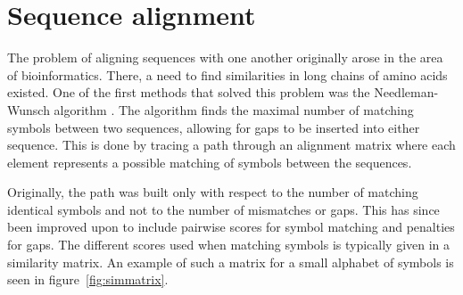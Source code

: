 \documentclass[a4paper]{report}
\begin{document}
\section{Sequence alignment}
The problem of aligning sequences with one another originally arose in the area
of bioinformatics. There, a need to find similarities in long chains of amino
acids existed. One of the first methods that solved this problem was the
Needleman-Wunsch algorithm \citep{needleman70}. The algorithm finds the maximal
number of matching symbols between two sequences, allowing for gaps to be
inserted into either sequence. This is done by tracing a path through an
alignment matrix where each element represents a possible matching of symbols
between the sequences.

Originally, the path was built only with respect to the number of matching
identical symbols and not to the number of mismatches or gaps. This has since
been improved upon to include pairwise scores for symbol matching and penalties
for gaps. The different scores used when matching symbols is typically given in
a similarity matrix. An example of such a matrix for a small alphabet of
symbols is seen in figure~\ref{fig:simmatrix}.
\end{document}
